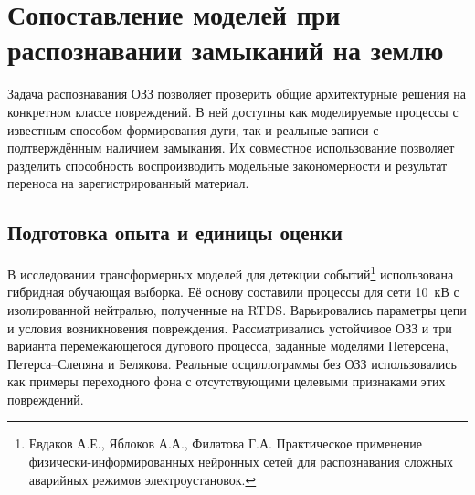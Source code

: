 \section{Сопоставление моделей при распознавании замыканий на землю}
\label{sec:ch4_ozz_validation}

{}

Задача распознавания ОЗЗ позволяет проверить общие
архитектурные решения на конкретном классе повреждений.
В ней доступны как моделируемые процессы с известным
способом формирования дуги, так и реальные записи
с подтверждённым наличием замыкания.
Их совместное использование позволяет разделить
способность воспроизводить модельные закономерности
и результат переноса на зарегистрированный материал.

\subsection{Подготовка опыта и единицы оценки}
\label{sec:ch4_ozz_test_protocol}


В исследовании трансформерных моделей для детекции событий\footnote{Евдаков А.Е.,
Яблоков А.А., Филатова Г.А.
Практическое применение физически-информированных нейронных
сетей для распознавания сложных аварийных режимов электроустановок.}
использована гибридная обучающая выборка.
Её основу составили процессы для сети 10~кВ
с изолированной нейтралью, полученные на RTDS.
Варьировались параметры цепи и условия возникновения
повреждения. Рассматривались устойчивое ОЗЗ
и три варианта перемежающегося дугового процесса,
заданные моделями Петерсена, Петерса--Слепяна и Белякова.
Реальные осциллограммы без ОЗЗ использовались
как примеры переходного фона с отсутствующими
целевыми признаками этих повреждений.

